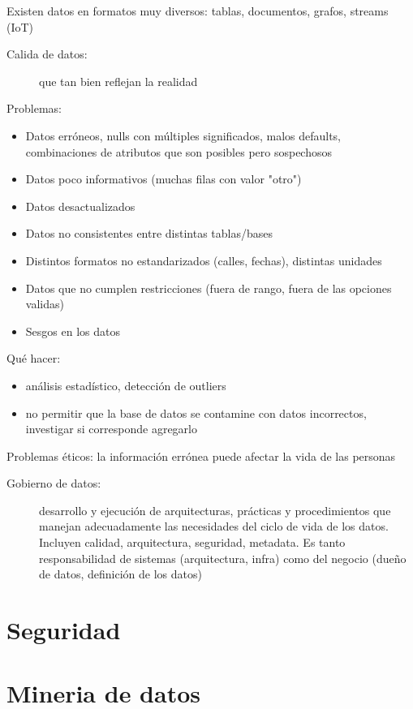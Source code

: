 Existen datos en formatos muy diversos: tablas, documentos, grafos, streams (IoT)

\begin{description}
	\item[Calida de datos:] que tan bien reflejan la realidad
\end{description}

Problemas:

\begin{itemize}
	\item Datos erróneos, nulls con múltiples significados, malos defaults, combinaciones de atributos que son posibles pero sospechosos
	\item Datos poco informativos (muchas filas con valor "otro")
	\item Datos desactualizados
	\item Datos no consistentes entre distintas tablas/bases
	\item Distintos formatos no estandarizados (calles, fechas), distintas unidades
	\item Datos que no cumplen restricciones (fuera de rango, fuera de las opciones validas)
	\item Sesgos en los datos
\end{itemize}

Qué hacer:

\begin{itemize}
	\item análisis estadístico, detección de outliers
	\item no permitir que la base de datos se contamine con datos incorrectos, investigar si corresponde agregarlo
\end{itemize}

Problemas éticos: la información errónea puede afectar la vida de las personas

\begin{description}
	\item[Gobierno de datos:] desarrollo y ejecución de arquitecturas, prácticas y procedimientos que manejan adecuadamente las necesidades del ciclo de vida de los datos. Incluyen calidad, arquitectura, seguridad, metadata. Es tanto responsabilidad de sistemas (arquitectura, infra) como del negocio (dueño de datos, definición de los datos)
\end{description}

\section{Seguridad}

\section{Mineria de datos}
